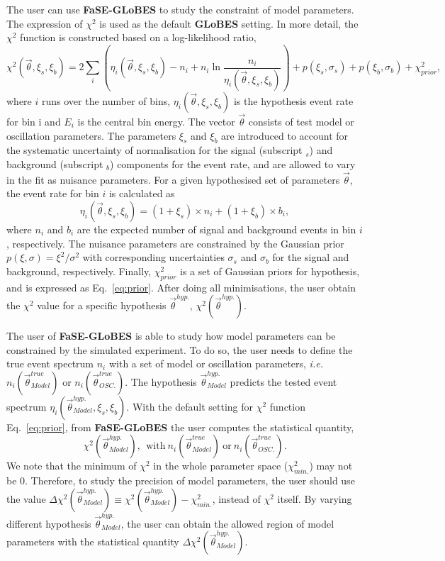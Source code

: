 \documentclass[aps,prd,nofootinbib,preprint]{revtex4}
\begin{document}
The user can use \textbf{FaSE-GLoBES} to study the constraint of model parameters. The expression of $\chi^2$ is used as the default \textbf{GLoBES} setting. In more detail, the $\chi^2$ function is constructed based on a log-likelihood ratio,
\begin{equation}\label{eq:chi-squared}
\chi^2(\vec{\theta},\xi_s,\xi_b)=2\sum_i\left(\eta_i(\vec{\theta},\xi_s,\xi_b)-n_i+n_i\ln\frac{n_i}{\eta_i(\vec{\theta},\xi_s,\xi_b)} \right)+p(\xi_s,\sigma_s)+p(\xi_b,\sigma_b)+\chi^2_{prior},
\end{equation}
where $i$ runs over the number of bins, $\eta_i(\vec{\theta},\xi_s,\xi_b)$ is the hypothesis event rate for bin i and $E_i$ is the central bin energy. The vector $\vec{\theta}$ consists of test model or oscillation parameters. The parameters $\xi_s$ and $\xi_b$ are introduced to account for the systematic uncertainty of normalisation for the signal (subscript $_s$) and background (subscript $_b$) components for the event rate, and are allowed to vary in the fit as nuisance parameters. For a given hypothesised set of parameters $\vec{\theta}$, the event rate for bin $i$ is calculated as\\
\begin{equation}
\eta_i(\vec{\theta},\xi_s,\xi_b)=(1+\xi_s)\times n_i+(1+\xi_b)\times b_i,
\end{equation}
where $n_i$ and $b_i$ are the expected number of signal and background events in bin $i$, respectively. The nuisance parameters are constrained by the Gaussian prior $p(\xi,\sigma)=\xi^2/\sigma^2$ with corresponding uncertainties $\sigma_s$ and $\sigma_b$ for the signal and background, respectively. Finally, $\chi^2_{prior}$ is a set of Gaussian priors for hypothesis, and is expressed as Eq.~\ref{eq:prior}. After doing all minimisations, the user obtain the $\chi^2$ value for a specific hypothesis $\vec{\theta}^{hyp.}$, $\chi^2(\vec{\theta}^{hyp.})$.

The user of \textbf{FaSE-GLoBES} is able to study how model parameters can be constrained by the simulated experiment. To do so, the user needs to define the true event spectrum $n_i$ with a set of model or oscillation parameters, \textit{i.e.}~$n_i(\vec{\theta}_{Model}^{true})$ or $n_i(\vec{\theta}_{OSC.}^{true})$. The hypothesis $\vec{\theta}_{Model}^{hyp.}$ predicts the tested event spectrum $\eta_i(\vec{\theta}_{Model}^{hyp.},\xi_s,\xi_b)$. With the default setting for $\chi^2$ function Eq.~\ref{eq:prior}, from \textbf{FaSE-GLoBES} the user computes the statistical quantity,
\begin{equation}\label{eq:chi_model}
\chi^2(\vec{\theta}_{Model}^{hyp.}),~~\text{with}~n_i(\vec{\theta}_{Model}^{true})~\text{or}~n_i(\vec{\theta}_{OSC.}^{true}).
\end{equation}
%
We note that the minimum of $\chi^2$ in the whole parameter space ($\chi^2_{min.}$) may not be $0$. Therefore, to study the precision of model parameters, the user should use the value $\Delta\chi^2(\vec{\theta}_{Model}^{hyp.})\equiv \chi^2(\vec{\theta}_{Model}^{hyp.})-\chi^2_{min.}$, instead of $\chi^2$ itself. By varying different hypothesis $\vec{\theta}_{Model}^{hyp.}$, the user can obtain the allowed region of model parameters with the statistical quantity $\Delta\chi^2(\vec{\theta}_{Model}^{hyp.})$. 
\end{document}

